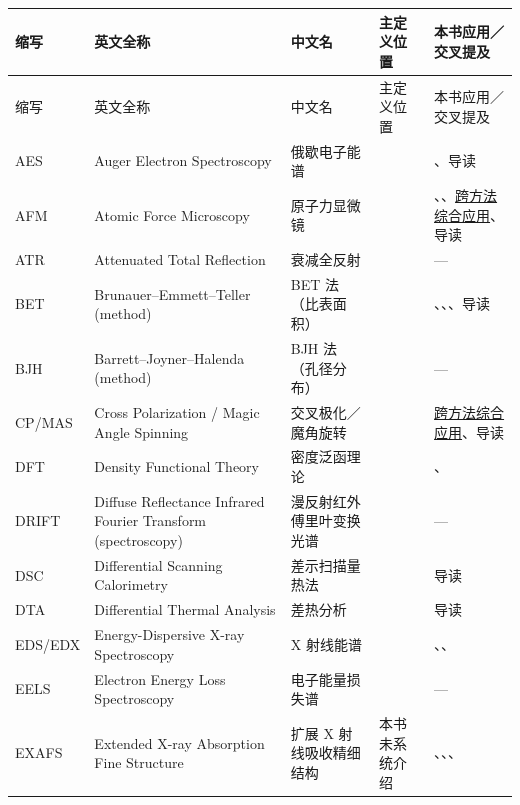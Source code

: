 {\srcsize
\begin{xltabular}{\textwidth}{@{}p{14mm}X p{40mm}p{20mm}p{34mm}@{}}
\toprule
缩写 & 英文全称 & 中文名 & 主定义位置 & 本书应用／交叉提及 \\
\midrule
\endfirsthead
\toprule
缩写 & 英文全称 & 中文名 & 主定义位置 & 本书应用／交叉提及 \\
\midrule
\endhead
\bottomrule
\endlastfoot
AES & Auger Electron Spectroscopy & 俄歇电子能谱 &  & 、导读 \\
AFM & Atomic Force Microscopy & 原子力显微镜 &  & 、、\hyperref[ch:13-synthesis]{跨方法综合应用}、导读 \\
ATR & Attenuated Total Reflection & 衰减全反射 &  & — \\
BET & Brunauer--Emmett--Teller (method) & BET 法（比表面积） &  & 、、、导读 \\
BJH & Barrett--Joyner--Halenda (method) & BJH 法（孔径分布） &  & — \\
CP/MAS & Cross Polarization / Magic Angle Spinning & 交叉极化／魔角旋转 &  & \hyperref[ch:13-synthesis]{跨方法综合应用}、导读 \\
DFT & Density Functional Theory & 密度泛函理论 &  & 、 \\
DRIFT & Diffuse Reflectance Infrared Fourier Transform (spectroscopy) & 漫反射红外傅里叶变换光谱 &  & — \\
DSC & Differential Scanning Calorimetry & 差示扫描量热法 &  & 导读 \\
DTA & Differential Thermal Analysis & 差热分析 &  & 导读 \\
EDS/EDX & Energy-Dispersive X-ray Spectroscopy & X 射线能谱 &  & 、、 \\
EELS & Electron Energy Loss Spectroscopy & 电子能量损失谱 &  & — \\
EXAFS & Extended X-ray Absorption Fine Structure & 扩展 X 射线吸收精细结构 & 本书未系统介绍 & 、、、 \\

\end{xltabular}}
